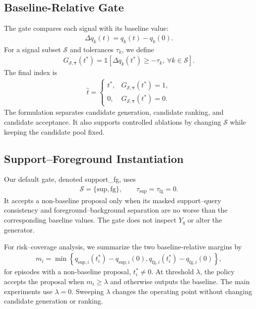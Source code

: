 \documentclass{CVM}
\begin{document}
\subsection{Baseline-Relative Gate}

The gate compares each signal with its baseline value:
\begin{align}
\Delta q_k(t)=q_k(t)-q_k(0).
\label{eq:delta}
\end{align}
For a signal subset $\mathcal{S}$ and tolerances $\tau_k$, we define
\begin{align}
G_{\mathcal{S},\boldsymbol{\tau}}(t^*)=
\mathbb{1}\left[\Delta q_k(t^*)\geq-\tau_k,\ \forall k\in\mathcal{S}\right].
\label{eq:general_gate}
\end{align}
The final index is
\begin{align}
\hat{t}=\begin{cases}
t^*, & G_{\mathcal{S},\boldsymbol{\tau}}(t^*)=1,\\
0, & G_{\mathcal{S},\boldsymbol{\tau}}(t^*)=0.
\end{cases}
\label{eq:guarded}
\end{align}
The formulation separates candidate generation, candidate ranking, and candidate acceptance. It also supports controlled ablations by changing $\mathcal{S}$ while keeping the candidate pool fixed.

\subsection{Support--Foreground Instantiation}

Our default gate, denoted support\_fg, uses
\begin{align}
\mathcal{S}=\{\mathrm{sup},\mathrm{fg}\},\qquad \tau_{\mathrm{sup}}=\tau_{\mathrm{fg}}=0.
\label{eq:supportfg}
\end{align}
It accepts a non-baseline proposal only when its masked support--query consistency and foreground--background separation are no worse than the corresponding baseline values. The gate does not inspect $Y_q$ or alter the generator.

For risk--coverage analysis, we summarize the two baseline-relative margins by
\begin{align}
m_i=\min\left\{
q_{\mathrm{sup},i}(t_i^*)-q_{\mathrm{sup},i}(0),
q_{\mathrm{fg},i}(t_i^*)-q_{\mathrm{fg},i}(0)
\right\},
\label{eq:margin}
\end{align}
for episodes with a non-baseline proposal, $t_i^*\neq 0$. At threshold $\lambda$, the policy accepts the proposal when $m_i\geq\lambda$ and otherwise outputs the baseline. The main experiments use $\lambda=0$. Sweeping $\lambda$ changes the operating point without changing candidate generation or ranking.
\end{document}
